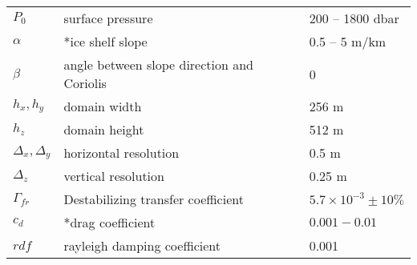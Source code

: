 \begin{table}[h]
\begin{center}
\begin{tabular}{lll}
	$P_0$           & surface pressure          & 200 -- 1800 dbar\\
	$\alpha$        & *ice shelf slope           & 0.5 -- 5 m/km\\
	$\beta$         & angle between slope direction and Coriolis & 0\\%
	$h_x,h_y$       & domain width              & 256 m\\
	$h_z$           & domain height             & 512 m\\ 
	$\Delta_x,\Delta_y$& horizontal resolution  & 0.5 m\\
	$\Delta_z$      & vertical resolution       & 0.25 m\\
    $\Gamma_{fr}$   & Destabilizing transfer coefficient & $5.7 \times 10^{-3} \pm 10\%$ \\%
	$c_d$           & *drag coefficient & $0.001 - 0.01$ \\
	$rdf$           & rayleigh damping coefficient & 0.001\\
    \hline
    \end{tabular}
    \end{center}
    \end{table}
